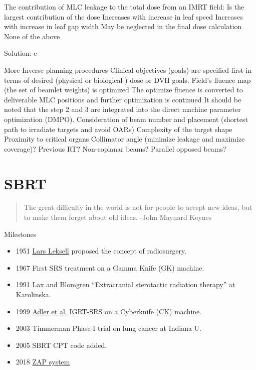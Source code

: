 \documentclass[]{book}
\providecommand{\tightlist}{%
  \setlength{\itemsep}{0pt}\setlength{\parskip}{0pt}}
\theoremstyle{definition}
\theoremstyle{definition}
\theoremstyle{definition}
\theoremstyle{remark}
\begin{document}
The contribution of MLC leakage to the total dose from an IMRT field: Is
the largest contribution of the dose Increases with increase in leaf
speed Increases with increase in leaf gap width May be neglected in the
final dose calculation None of the above

Solution: e

More Inverse planning procedures Clinical objectives (goals) are
specified first in terms of desired (physical or biological ) dose or
DVH goals. Field's fluence map (the set of beamlet weights) is optimized
The optimize fluence is converted to deliverable MLC positions and
further optimization is continued It should be noted that the step 2 and
3 are integrated into the direct machine parameter optimization (DMPO).
Consideration of beam number and placement (shortest path to irradiate
targets and avoid OARs) Complexity of the target shape Proximity to
critical organs Collimator angle (minimize leakage and maximize
coverage)? Previous RT? Non-coplanar beams? Parallel opposed beams?

\chapter{SBRT}\label{sbrt}

\begin{quote}
The great difficulty in the world is not for people to accept new ideas,
but to make them forget about old ideas. -John Maynard Keynes
\end{quote}

Milestones

\begin{itemize}
\tightlist
\item
  1951 \href{https://en.wikipedia.org/wiki/Lars_Leksell}{Lars Leksell}
  proposed the concept of radiosurgery.
\item
  1967 First SRS treatment on a Gamma Knife (GK) machine.
\item
  1991 Lax and Blomgren ``Extracranial sterotactic radiation therapy''
  at Karolinska.
\item
  1999 \href{https://www.ncbi.nlm.nih.gov/pubmed/10371630}{Adler et al.}
  IGRT-SRS on a Cyberknife (CK) machine.
\item
  2003 Timmerman Phase-I trial on lung cancer at Indiana U.
\item
  2005 SBRT CPT code added.
\item
  2018
  \href{https://www.cureus.com/articles/9924-self-shielding-analysis-of-the-zap-x-system}{ZAP
  system}
\end{itemize}
\end{document}
